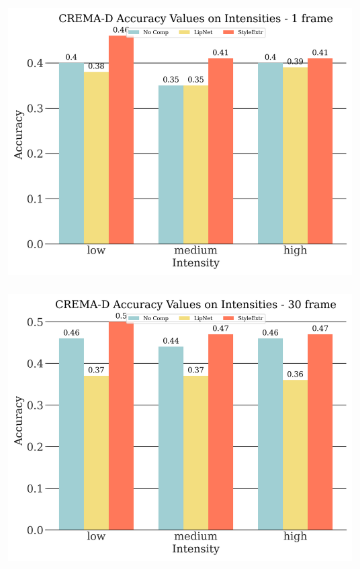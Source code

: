 \begin{figure}[!htb]
    \centering
    \begin{subfigure}[b]{0.45\textwidth}
      \includegraphics[width=\textwidth]{res/crema-intensities-1.png}
    \end{subfigure}
    \begin{subfigure}[b]{0.45\textwidth}
      \includegraphics[width=\textwidth]{res/crema-intensities-30.png}
    \end{subfigure}
    \begin{subfigure}[b]{0.45\textwidth}

\end{subfigure}
\end{figure}
